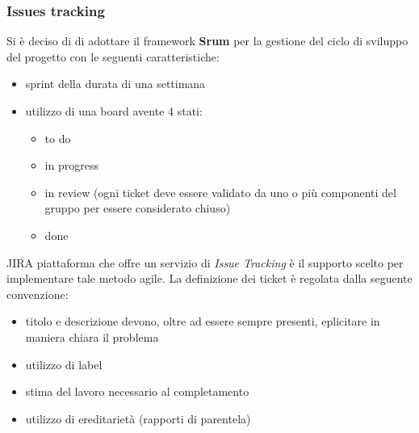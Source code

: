     \subsubsection{Issues tracking}
    Si è deciso di di adottare il framework \textbf{Srum} per la gestione del ciclo di sviluppo del progetto con le seguenti caratteristiche:
    \begin{itemize}
        \item sprint della durata di una settimana
        \item utilizzo di una board avente 4 stati:
            \begin{itemize}
                \item to do
                \item in progress
                \item in review (ogni ticket deve essere validato da uno o più componenti del gruppo per essere considerato chiuso)
                \item done
            \end{itemize}
    \end{itemize}
    JIRA piattaforma che offre un servizio di \textit{Issue Tracking} è il supporto scelto per implementare tale metodo agile.
    La definizione dei ticket è regolata dalla seguente convenzione:
    \begin{itemize}
        \item titolo e descrizione devono, oltre ad essere sempre presenti, eplicitare in maniera chiara il problema
        \item utilizzo di label
        \item stima del lavoro necessario al completamento
        \item utilizzo di ereditarietà (rapporti di parentela)
    \end{itemize}

